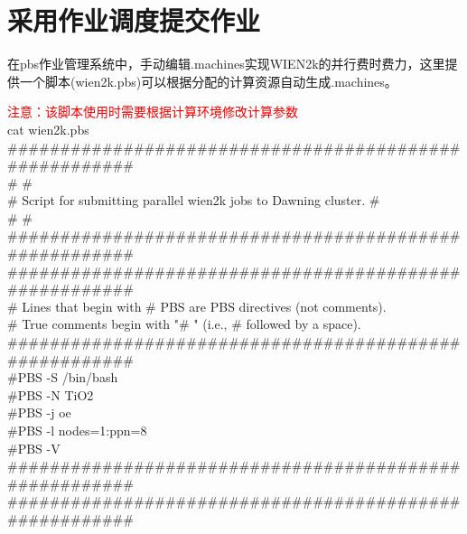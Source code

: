 \documentclass[10pt,a4paper]{article}
\begin{document}
\section{采用作业调度提交作业}
在pbs作业管理系统中，手动编辑\textrm{.machines}实现WIEN2k的并行费时费力，这里提供一个脚本(\textrm{wien2k.pbs})可以根据分配的计算资源自动生成\textrm{.machines}。

\textcolor{red}{注意：该脚本使用时需要根据计算环境修改计算参数}\\
cat wien2k.pbs \\
\#\#\#\#\#\#\#\#\#\#\#\#\#\#\#\#\#\#\#\#\#\#\#\#\#\#\#\#\#\#\#\#\#\#\#\#\#\#\#\#\#\#\#\#\#\#\#\#\#\#\#\#\#\#\#\\%
\# \#\\
\# Script for submitting parallel wien2k jobs to Dawning cluster. \#\\
\# \#\\
\#\#\#\#\#\#\#\#\#\#\#\#\#\#\#\#\#\#\#\#\#\#\#\#\#\#\#\#\#\#\#\#\#\#\#\#\#\#\#\#\#\#\#\#\#\#\#\#\#\#\#\#\#\#\#\\%
\#\#\#\#\#\#\#\#\#\#\#\#\#\#\#\#\#\#\#\#\#\#\#\#\#\#\#\#\#\#\#\#\#\#\#\#\#\#\#\#\#\#\#\#\#\#\#\#\#\#\#\#\#\#\#\\%
\# Lines that begin with \# PBS are PBS directives (not comments).\\
\# True comments begin with "\# " (i.e., \# followed by a space).\\
\#\#\#\#\#\#\#\#\#\#\#\#\#\#\#\#\#\#\#\#\#\#\#\#\#\#\#\#\#\#\#\#\#\#\#\#\#\#\#\#\#\#\#\#\#\#\#\#\#\#\#\#\#\#\#\\%
\#PBS -S /bin/bash\\
\#PBS -N TiO2\\
\#PBS -j oe\\
\#PBS -l nodes=1:ppn=8\\
\#PBS -V\\
\#\#\#\#\#\#\#\#\#\#\#\#\#\#\#\#\#\#\#\#\#\#\#\#\#\#\#\#\#\#\#\#\#\#\#\#\#\#\#\#\#\#\#\#\#\#\#\#\#\#\#\#\#\#\#\\%
\#\#\#\#\#\#\#\#\#\#\#\#\#\#\#\#\#\#\#\#\#\#\#\#\#\#\#\#\#\#\#\#\#\#\#\#\#\#\#\#\#\#\#\#\#\#\#\#\#\#\#\#\#\#\#\\%
\end{document}
